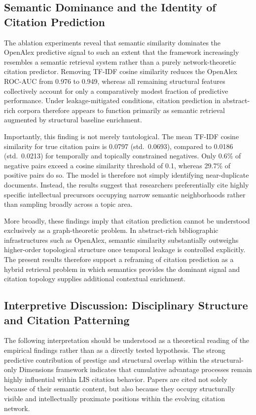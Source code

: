 \documentclass[11pt,a4paper]{article}
\begin{document}
\subsection{Semantic Dominance and the Identity of Citation Prediction}

The ablation experiments reveal that semantic similarity dominates the OpenAlex predictive signal to such an extent that the framework increasingly resembles a semantic retrieval system rather than a purely network-theoretic citation predictor. Removing TF-IDF cosine similarity reduces the OpenAlex ROC-AUC from 0.976 to 0.949, whereas all remaining structural features collectively account for only a comparatively modest fraction of predictive performance. Under leakage-mitigated conditions, citation prediction in abstract-rich corpora therefore appears to function primarily as semantic retrieval augmented by structural baseline enrichment.

Importantly, this finding is not merely tautological. The mean TF-IDF cosine similarity for true citation pairs is 0.0797 (std.~0.0693), compared to 0.0186 (std.~0.0213) for temporally and topically constrained negatives. Only 0.6\% of negative pairs exceed a cosine similarity threshold of 0.1, whereas 29.7\% of positive pairs do so. The model is therefore not simply identifying near-duplicate documents. Instead, the results suggest that researchers preferentially cite highly specific intellectual precursors occupying narrow semantic neighborhoods rather than sampling broadly across a topic area.

More broadly, these findings imply that citation prediction cannot be understood exclusively as a graph-theoretic problem. In abstract-rich bibliographic infrastructures such as OpenAlex, semantic similarity substantially outweighs higher-order topological structure once temporal leakage is controlled explicitly. The present results therefore support a reframing of citation prediction as a hybrid retrieval problem in which semantics provides the dominant signal and citation topology supplies additional contextual enrichment.

\subsection{Interpretive Discussion: Disciplinary Structure and Citation Patterning}

The following interpretation should be understood as a theoretical reading of the empirical findings rather than as a directly tested hypothesis. The strong predictive contribution of prestige and structural overlap within the structural-only Dimensions framework indicates that cumulative advantage processes remain highly influential within LIS citation behavior. Papers are cited not solely because of their semantic content, but also because they occupy structurally visible and intellectually proximate positions within the evolving citation network.
\end{document}

